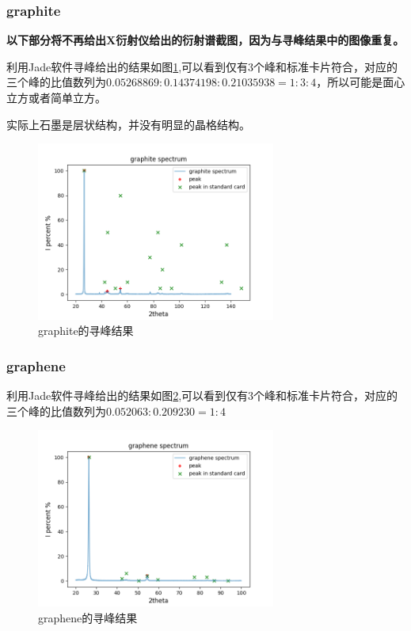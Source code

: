 \documentclass[10pt]{ctexart}
\begin{document}
\subsubsection{graphite}
\textbf{以下部分将不再给出X衍射仪给出的衍射谱截图，因为与寻峰结果中的图像重复。}

利用Jade软件寻峰给出的结果如图\ref{fig:graphite},可以看到仅有3个峰和标准卡片符合，对应的
三个峰的比值数列为$0.05268869:0.14374198:0.21035938=1:3:4$，所以可能是面心立方或者简单立方。

实际上石墨是层状结构，并没有明显的晶格结构。
\begin{figure}
    \centering
    \includegraphics[width=0.7\textwidth]{data/graphite/spec.png}
    \caption{graphite的寻峰结果}
    \label{fig:graphite}
\end{figure}

\subsubsection{graphene}
利用Jade软件寻峰给出的结果如图\ref{fig:graphene},可以看到仅有3个峰和标准卡片符合，对应的
三个峰的比值数列为$0.052063:0.209230=1:4$
\begin{figure}
    \centering
    \includegraphics[width=0.7\textwidth]{data/graphene/spectrum.png}
    \caption{graphene的寻峰结果}
    \label{fig:graphene}
\end{figure}
\end{document}
